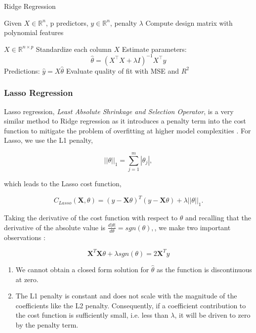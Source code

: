 \documentclass[amssymb,twocolumn,aps]{revtex4}
\begin{document}
\begin{algorithm}[H]
    \caption{Ridge Regression}
    \label{algorithm:Ridge}
    \begin{algorithmic}[1]
        \State Given $X \in \mathbb{R}^{n}$, p predictors, $y \in \mathbb{R}^n$, penalty $\lambda$
        \State Compute design matrix with polynomial features
        
        $X \in \mathbb{R}^{n \times p}$
        \State Standardize each column $X$
        \State Estimate parameters:
        $$\hat{\theta} = (X^\top X + \lambda I)^{-1} X^\top y$$
        \State Predictions: $\hat{y} = X \hat{\theta}$
        \State Evaluate quality of fit with MSE and $R^2$
    \end{algorithmic}
\end{algorithm}



\subsubsection{Lasso Regression}

Lasso regression, \textit{Least Absolute Shrinkage and Selection Operator}, is a very similar method to Ridge regression as it introduces a penalty term into the cost function to mitigate the problem of overfitting at higher model complexities \cite{Raschka-et-al-2022}. For Lasso, we use the L1 penalty,

$$||\theta||_1 = \sum^m_{j=1}|\theta_j|,$$

which leads to the Lasso cost function, 

$$ C_{Lasso}(\boldsymbol{X}, \theta) = (y - \boldsymbol{X}\theta)^T(y-\boldsymbol{X}\theta) + \lambda ||\theta||_1.$$ 

Taking the derivative of the cost function with respect to $\theta$ and recalling that the derivative of the absolute value is $\frac{d|\theta|}{d\theta} = sgn(\theta),$, we make two important observations \cite{fysml2}\cite{Hastie-et-al-2009}:

$$\boldsymbol{X}^T\boldsymbol{X} \theta + \lambda sgn(\theta) = 2\boldsymbol{X}^Ty$$

\begin{enumerate}
    \item We cannot obtain a closed form solution for $\hat{\theta}$ as the function is discontinuous at zero.
    \item The L1 penalty is constant and does not scale with the magnitude of the coefficients like the L2 penalty. Consequently, if a coefficient contribution to the cost function is sufficiently small, i.e. less than $\lambda$, it will be driven to zero by the penalty term.
\end{enumerate}
\end{document}
